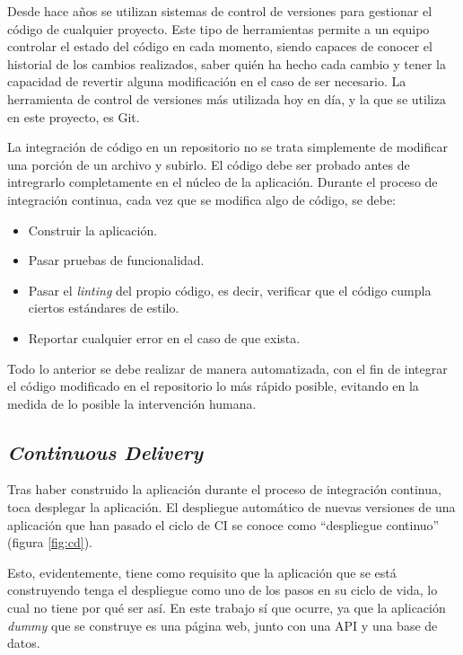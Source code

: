 Desde hace años se utilizan sistemas de control de versiones para gestionar el código de cualquier proyecto. Este tipo de herramientas permite a un equipo controlar el estado del código en cada momento, siendo capaces de conocer el historial de los cambios realizados, saber quién ha hecho cada cambio y tener la capacidad de revertir alguna modificación en el caso de ser necesario. La herramienta de control de versiones más utilizada hoy en día, y la que se utiliza en este proyecto, es Git\cite{git}.

La integración de código en un repositorio no se trata simplemente de modificar una porción de un archivo y subirlo. El código debe ser probado antes de intregrarlo completamente en el núcleo de la aplicación. Durante el proceso de integración continua, cada vez que se modifica algo de código, se debe:

\begin{itemize}
  \item Construir la aplicación.
  \item Pasar pruebas de funcionalidad.
  \item Pasar el \textit{linting} del propio código, es decir, verificar que el código cumpla ciertos estándares de estilo.
  \item Reportar cualquier error en el caso de que exista.
\end{itemize}

Todo lo anterior se debe realizar de manera automatizada, con el fin de integrar el código modificado en el repositorio lo más rápido posible, evitando en la medida de lo posible la intervención humana.

\subsection*{\textit{Continuous Delivery}}
\label{subsec:CD}

Tras haber construido la aplicación durante el proceso de integración continua, toca desplegar la aplicación. El despliegue automático de nuevas versiones de una aplicación que han pasado el ciclo de CI se conoce como ``despliegue continuo'' (figura \ref{fig:cd}).

Esto, evidentemente, tiene como requisito que la aplicación que se está construyendo tenga el despliegue como uno de los pasos en su ciclo de vida, lo cual no tiene por qué ser así. En este trabajo sí que ocurre, ya que la aplicación \textit{dummy} que se construye es una página web, junto con una API y una base de datos.

